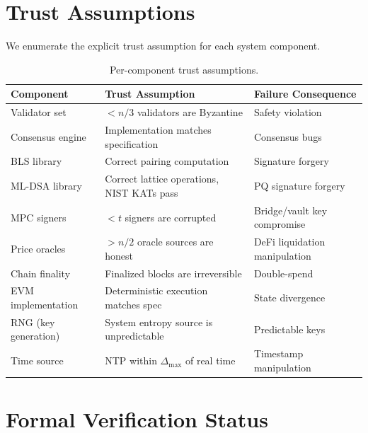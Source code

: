 \documentclass[11pt,a4paper]{article}
\begin{document}
\section{Trust Assumptions}
\label{sec:trust}

We enumerate the explicit trust assumption for each system component.

\begin{table}[ht]
\centering
\caption{Per-component trust assumptions.}
\label{tab:trust}
\begin{tabular}{p{3cm}p{5cm}p{4cm}}
\toprule
\textbf{Component} & \textbf{Trust Assumption} & \textbf{Failure Consequence} \\
\midrule
Validator set & $< n/3$ validators are Byzantine & Safety violation \\
Consensus engine & Implementation matches specification & Consensus bugs \\
BLS library & Correct pairing computation & Signature forgery \\
ML-DSA library & Correct lattice operations, NIST KATs pass & PQ signature forgery \\
MPC signers & $< t$ signers are corrupted & Bridge/vault key compromise \\
Price oracles & $> n/2$ oracle sources are honest & DeFi liquidation manipulation \\
Chain finality & Finalized blocks are irreversible & Double-spend \\
EVM implementation & Deterministic execution matches spec & State divergence \\
RNG (key generation) & System entropy source is unpredictable & Predictable keys \\
Time source & NTP within $\Delta_{\text{max}}$ of real time & Timestamp manipulation \\
\bottomrule
\end{tabular}
\end{table}

\section{Formal Verification Status}
\label{sec:verification}
\end{document}

